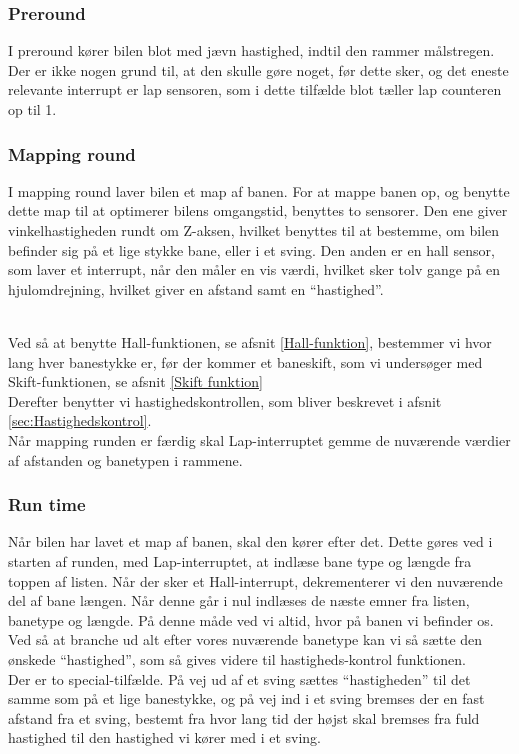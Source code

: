 \subsubsection{Preround}
I preround kører bilen blot med jævn hastighed, indtil den rammer målstregen. Der er ikke nogen grund til, at den skulle gøre noget, før dette sker, og det eneste relevante interrupt er lap sensoren, som i dette tilfælde blot tæller lap counteren op til 1.

\subsubsection{Mapping round}
I mapping round laver bilen et map af banen. For at mappe banen op, og benytte dette map til at optimerer bilens omgangstid, benyttes to sensorer. Den ene giver vinkelhastigheden rundt om Z-aksen, hvilket benyttes til at bestemme, om bilen befinder sig på et lige stykke bane, eller i et sving. Den anden er en hall sensor, som laver et interrupt, når den måler en vis værdi, hvilket sker tolv gange på en hjulomdrejning, hvilket giver en afstand samt en ``hastighed''. 
\\\

Ved så at benytte Hall-funktionen, se afsnit \ref{Hall-funktion}, bestemmer vi hvor lang hver banestykke er, før der kommer et baneskift, som vi undersøger med Skift-funktionen, se afsnit \ref{Skift funktion}
\\
Derefter benytter vi hastighedskontrollen, som bliver beskrevet i afsnit \ref{sec:Hastighedskontrol}.
\\
Når mapping runden er færdig skal Lap-interruptet gemme de nuværende værdier af afstanden og banetypen i rammene. 

\subsubsection{Run time}

Når bilen har lavet et map af banen, skal den kører efter det. Dette gøres ved i starten af runden, med Lap-interruptet, at indlæse bane type og længde fra toppen af listen. Når der sker et Hall-interrupt, dekrementerer vi den nuværende del af bane længen. Når denne går i nul indlæses de næste emner fra listen, banetype og længde. På denne måde ved vi altid, hvor på banen vi befinder os.
\\
Ved så at branche ud alt efter vores nuværende banetype kan vi så sætte den ønskede ``hastighed'', som så gives videre til hastigheds-kontrol funktionen.
\\
Der er to special-tilfælde. På vej ud af et sving sættes ``hastigheden'' til det samme som på et lige banestykke, og på vej ind i et sving bremses der en fast afstand fra et sving, bestemt fra hvor lang tid der højst skal bremses fra fuld hastighed til den hastighed vi kører med i et sving.
